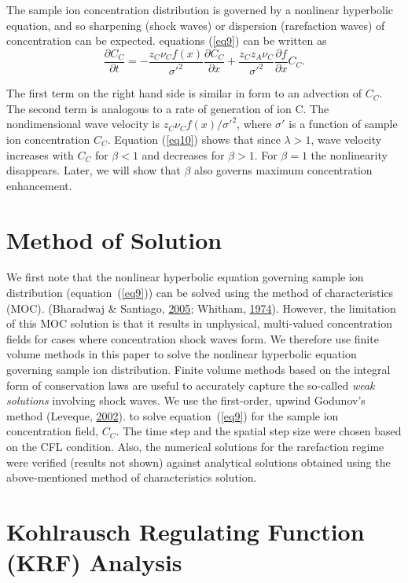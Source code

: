 \documentclass[lineno,authoryear]{FLO_v1}%
\theoremstyle{definition}
\begin{document}
The sample ion concentration distribution is governed by a
nonlinear hyperbolic equation, and so sharpening (shock
waves) or dispersion (rarefaction waves) of concentration
can be expected. equations (\ref{eq9}) can be written as
\begin{equation}\label{eq11}
\frac{\partial C_C }{\partial t}=-\frac{z_C \nu _C
f(x)}{{\sigma }'^2}\frac{\partial C_C }{\partial
x}+\frac{z_C z_A \nu _C }{{\sigma }'^2}\frac{\partial
f}{\partial x}C_C.
\end{equation}

The first term on the right hand side is similar in form to
an advection of $C_{C}$. The second term is analogous to a
rate of generation of ion C. The nondimensional wave
velocity is $z_C \nu _C f(x)/\sigma'^2$, where ${\sigma}'$
is a function of sample ion concentration $C_{C}$. Equation
(\ref{eq10}) shows that since $\lambda> 1$, wave velocity
increases with $C_{C}$ for $\beta < 1$ and decreases for
$\beta > 1$. For $\beta =1$ the nonlinearity disappears.
Later, we will show that $\beta$ also governs maximum
concentration enhancement.

\section{Method of Solution}

We first note that the nonlinear hyperbolic equation
governing sample ion distribution (equation~(\ref{eq9}))
can be solved using the method of characteristics (MOC).
(Bharadwaj \& Santiago, \hyperlink{bib1}{2005}; Whitham,
\hyperlink{bib21}{1974}). However, the limitation of this
MOC solution is that it results in unphysical, multi-valued
concentration fields for cases where concentration shock
waves form. We therefore use finite volume methods in this
paper to solve the nonlinear hyperbolic equation governing
sample ion distribution. Finite volume methods based on the
integral form of conservation laws are useful to accurately
capture the so-called \textit{weak solutions} involving
shock waves. We use the first-order, upwind Godunov's
method (Leveque, \hyperlink{bib17}{2002}). to solve
equation~(\ref{eq9}) for the sample ion concentration
field, $C_{C}$. The time step and the spatial step size
were chosen based on the CFL condition. Also, the numerical
solutions for the rarefaction regime were verified (results
not shown) against analytical solutions obtained using the
above-mentioned method of characteristics solution.

\section{Kohlrausch Regulating Function (KRF) Analysis}
\end{document}
